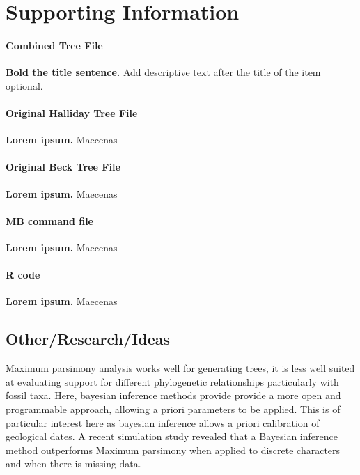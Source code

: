 \documentclass[11pt,letterpaper]{article}
\begin{document}
\newpage


\section{Supporting Information}

\paragraph*{Combined Tree File}
\label{S1_Fig}
{\bf Bold the title sentence.} Add descriptive text after the title of the item optional.

\paragraph*{Original Halliday Tree File}
\label{S2_Fig}
{\bf Lorem ipsum.} Maecenas 

\paragraph*{Original Beck Tree File}
\label{S1_File}
{\bf Lorem ipsum.}  Maecenas 
\paragraph*{MB command file}
\label{S1_Video}
{\bf Lorem ipsum.}  Maecenas 

\paragraph*{R code}
\label{S1_Appendix}
{\bf Lorem ipsum.} Maecenas 

\newpage

\subsection{Other/Research/Ideas}


Maximum parsimony analysis works well for generating trees, it is less well suited at evaluating support for different phylogenetic relationships particularly with fossil taxa. Here, bayesian inference methods provide provide a more open and programmable approach, allowing a priori parameters to be applied. This is of particular interest here as bayesian inference allows a priori calibration of geological dates. A recent simulation study revealed that a Bayesian inference method outperforms Maximum parsimony when applied to discrete characters and when there is missing data.
\end{document}
